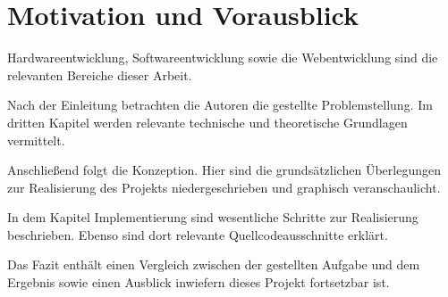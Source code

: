 \section{Motivation und Vorausblick}
Hardwareentwicklung, Softwareentwicklung sowie die Webentwicklung sind die relevanten Bereiche dieser Arbeit. 

Nach der Einleitung betrachten die Autoren die gestellte Problemstellung. 
Im dritten Kapitel werden relevante technische und theoretische Grundlagen vermittelt. 

Anschließend folgt die Konzeption. Hier sind die grundsätzlichen Überlegungen zur Realisierung des Projekts niedergeschrieben und graphisch veranschaulicht. 

In dem Kapitel Implementierung sind wesentliche Schritte zur Realisierung beschrieben. Ebenso sind dort relevante Quellcodeausschnitte erklärt.

Das Fazit enthält einen Vergleich zwischen der gestellten Aufgabe und dem Ergebnis sowie einen Ausblick inwiefern dieses Projekt fortsetzbar ist.